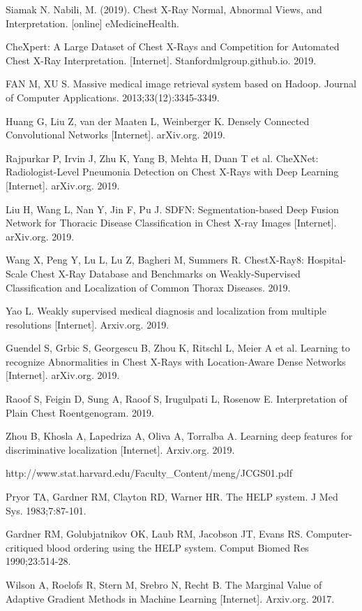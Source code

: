 \documentclass{amia}
\begin{document}

\begin{thebibliography}{1}
\setlength\itemsep{-0.1em}

Siamak N. Nabili, M. (2019). Chest X-Ray Normal, Abnormal Views, and Interpretation. [online] eMedicineHealth.

CheXpert: A Large Dataset of Chest X-Rays and Competition for Automated Chest X-Ray Interpretation. [Internet]. Stanfordmlgroup.github.io. 2019.

FAN M, XU S. Massive medical image retrieval system based on Hadoop. Journal of Computer Applications. 2013;33(12):3345-3349.

Huang G, Liu Z, van der Maaten L, Weinberger K. Densely Connected Convolutional Networks [Internet]. arXiv.org. 2019.

Rajpurkar P, Irvin J, Zhu K, Yang B, Mehta H, Duan T et al. CheXNet: Radiologist-Level Pneumonia Detection on Chest X-Rays with Deep Learning [Internet]. arXiv.org. 2019.

Liu H, Wang L, Nan Y, Jin F, Pu J. SDFN: Segmentation-based Deep Fusion Network for Thoracic Disease Classification in Chest X-ray Images [Internet]. arXiv.org. 2019.

Wang X, Peng Y, Lu L, Lu Z, Bagheri M, Summers R. ChestX-Ray8: Hospital-Scale Chest X-Ray Database and Benchmarks on Weakly-Supervised Classification and Localization of Common Thorax Diseases. 2019.

Yao L. Weakly supervised medical diagnosis and localization from multiple resolutions [Internet]. Arxiv.org. 2019.

Guendel S, Grbic S, Georgescu B, Zhou K, Ritschl L, Meier A et al. Learning to recognize Abnormalities in Chest X-Rays with Location-Aware Dense Networks [Internet]. arXiv.org. 2019.

Raoof S, Feigin D, Sung A, Raoof S, Irugulpati L, Rosenow E. Interpretation of Plain Chest Roentgenogram. 2019.

Zhou B, Khosla A, Lapedriza A, Oliva A, Torralba A. Learning deep features for discriminative localization [Internet]. Arxiv.org. 2019.

http://www.stat.harvard.edu/Faculty\_Content/meng/JCGS01.pdf

Pryor TA, Gardner RM, Clayton RD, Warner HR. The HELP system. J Med Sys. 1983;7:87-101.

Gardner RM, Golubjatnikov OK, Laub RM, Jacobson JT, Evans RS. Computer-critiqued blood ordering using the HELP system. Comput Biomed Res 1990;23:514-28.

Wilson A, Roelofs R, Stern M, Srebro N, Recht B. The Marginal Value of Adaptive Gradient Methods in Machine Learning [Internet]. Arxiv.org. 2017.


\end{thebibliography}
\end{document}
